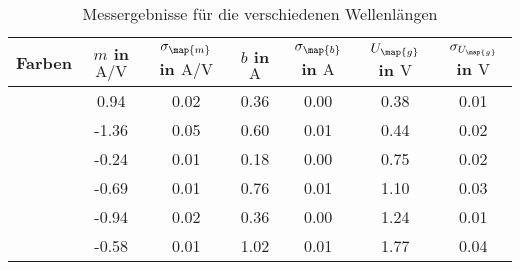 \begin{table}
\centering
\caption{Messergebnisse für die verschiedenen Wellenlängen}
\label{tab: messergebnisse}
\begin{tabular}{ S S S S S S S }
\toprule
 {Farben} & {$m$ in $\si{\ampere\per\volt}$} & { $\sigma_{\map{m}}$ in $\si{\ampere\per\volt}$ } & { $b$ in $\si{\ampere}$} & { $\sigma_{\map{b}}$ in $\si{\ampere}$} & {$U_{\map{g}}$ in $\si{\volt}$ } & { $\sigma_{U_{\map{g}}}$ in $\si{\volt}$}     \\
\midrule
{} &  0.94  & 0.02  & 0.36  & 0.00  & 0.38  & 0.01\\
& -1.36  & 0.05  & 0.60  & 0.01  & 0.44  & 0.02\\
& -0.24  & 0.01  & 0.18  & 0.00  & 0.75  & 0.02\\
& -0.69  & 0.01  & 0.76  & 0.01  & 1.10  & 0.03\\
 & -0.94  & 0.02  & 0.36  & 0.00  & 1.24  & 0.01\\
& -0.58  & 0.01  & 1.02  & 0.01  & 1.77  & 0.04\\
\bottomrule
\end{tabular}
\end{table}
